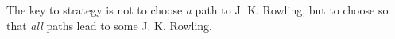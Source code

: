 The key to strategy is not to choose \emph{a} path to J. K. Rowling, but to choose so that \emph{all} paths lead to some J. K. Rowling.


